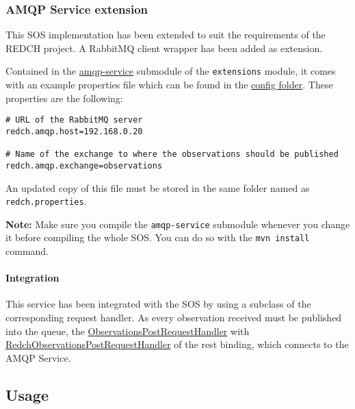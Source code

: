 \subsubsection*{AMQP Service extension}\label{amqp-service-extension}

This SOS implementation has been extended to suit the requirements of
the REDCH project. A RabbitMQ client wrapper has been added as
extension.

Contained in the
\href{https://github.com/sauloperez/sos/tree/master/src/extensions/amqp-service}{amqp-service}
submodule of the \texttt{extensions} module, it comes with an example
properties file which can be found in the
\href{https://github.com/sauloperez/sos/tree/master/config}{config
folder}. These properties are the following:

\begin{verbatim}
# URL of the RabbitMQ server
redch.amqp.host=192.168.0.20

# Name of the exchange to where the observations should be published
redch.amqp.exchange=observations
\end{verbatim}

An updated copy of this file must be stored in the same folder named as \\
\texttt{redch.properties}.

\textbf{Note:} Make sure you compile the \texttt{amqp-service} submodule
whenever you change it before compiling the whole SOS. You can do so
with the \texttt{mvn install} command.

\paragraph{Integration}\label{integration}

This service has been integrated with the SOS by using a subclass of the
corresponding request handler. As every observation received must be
published into the queue, the
\href{https://github.com/sauloperez/sos/blob/master/src/bindings/rest/code/src/main/java/org/n52/sos/binding/rest/resources/observations/ObservationsPostRequestHandler.java}{ObservationsPostRequestHandler}
with
\href{https://github.com/sauloperez/sos/blob/mastero/src/bindings/rest/code/src/main/java/org/n52/sos/binding/rest/resources/observations/RedchObservationsPostRequestHandler.java}{RedchObservationsPostRequestHandler}
of the rest binding, which connects to the AMQP Service.

\subsection*{Usage}\label{usage}

